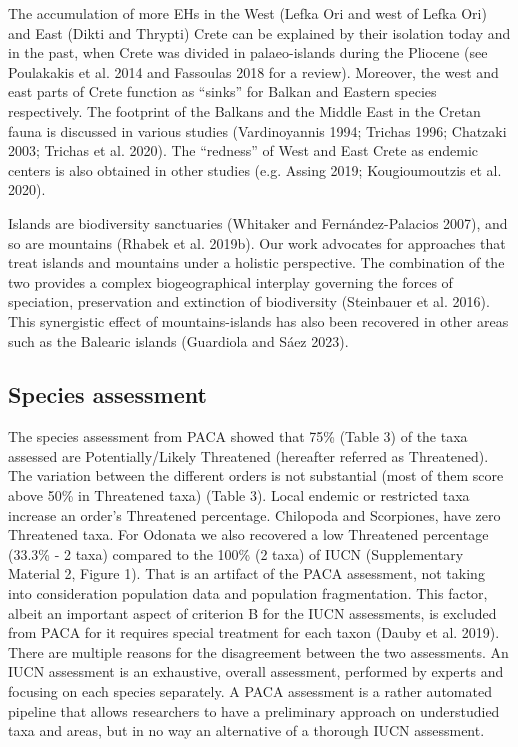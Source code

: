 The accumulation of more EHs in the West (Lefka Ori and west of Lefka Ori) and
East (Dikti and Thrypti) Crete can be explained by their isolation today and in
the past, when Crete was divided in palaeo-islands during the Pliocene
(see Poulakakis et al. 2014 and Fassoulas 2018 for a review). Moreover, the
west and east parts of Crete function as “sinks'' for Balkan and Eastern
species respectively. The footprint of the Balkans and the Middle East in the
Cretan fauna is discussed in various studies (Vardinoyannis 1994; Trichas 1996; Chatzaki 2003; Trichas et al. 2020).
The “redness” of West and East Crete as endemic centers is also obtained in
other studies (e.g. Assing 2019; Kougioumoutzis et al. 2020). 

Islands are biodiversity sanctuaries (Whitaker and Fernández-Palacios 2007), and
so are mountains (Rhabek et al. 2019b). Our work advocates for approaches that
treat islands and mountains under a holistic perspective. The combination of
the two provides a complex biogeographical interplay governing the forces of
speciation, preservation and extinction of biodiversity (Steinbauer et al. 2016).
This synergistic effect of mountains-islands has also been recovered in other
areas such as the Balearic islands (Guardiola and Sáez 2023).

    \subsection{Species assessment}
    \label{subsec:arthropods-species-assessment-disc}

The species assessment from PACA showed that 75\% (Table 3) of the
taxa assessed are Potentially/Likely Threatened (hereafter referred as Threatened).
The variation between the different orders is not substantial (most of them
score above 50\% in Threatened taxa) (Table 3). Local endemic or restricted taxa
increase an order’s Threatened percentage. Chilopoda and Scorpiones, have zero
Threatened taxa. For Odonata we also recovered a low Threatened percentage
(33.3\% - 2 taxa) compared to the 100\% (2 taxa) of IUCN
(Supplementary Material 2, Figure 1). That is an artifact of the PACA
assessment, not taking into consideration population data and population
fragmentation. This factor, albeit an important aspect of criterion B for the
IUCN assessments, is excluded from PACA for it requires special treatment for
each taxon (Dauby et al. 2019). There are multiple reasons for the disagreement
between the two assessments. An IUCN assessment is an exhaustive, overall
assessment, performed by experts and focusing on each species separately.
A PACA assessment is a rather automated pipeline that allows researchers to
have a preliminary approach on understudied taxa and areas, but in no way an
alternative of a thorough IUCN assessment.

